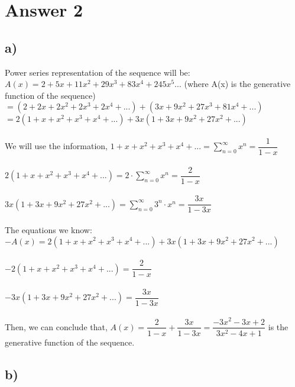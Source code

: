 \documentclass[12pt]{article}
\begin{document}
\section*{Answer 2}
\subsection*{a) }
Power series representation of the sequence will be:\\
$A(x) = 2 + 5x + 11x^2 + 29x^3 + 83x^4 + 245x^5 ...$ (where A(x) is the generative function of the sequence)\\
$= (2 + 2x + 2x^2 + 2x^3 +2x^4 + ...) + (3x + 9x^2 + 27x^3 + 81x^4 + ...)$\\
$= 2(1 + x + x^2 + x^3 + x^4 + ...) + 3x(1 + 3x + 9x^2 + 27x^2 + ...)$\\
\\
We will use the information, $1 + x + x^2 + x^3 + x^4 + ... = \sum^{\infty}_{n=0} x^n = \dfrac{1}{1-x}$\\
\\
$2(1 + x + x^2 + x^3 + x^4 + ...) = 2 \cdot \sum^{\infty}_{n=0} x^n = \dfrac{2}{1-x}$\\
\\
$3x(1 + 3x + 9x^2 + 27x^2 + ...) = \sum^{\infty}_{n=0} 3^n \cdot x^n = \dfrac{3x}{1-3x}$\\
\\
The equations we know:\\
$-$$A(x) = 2(1 + x + x^2 + x^3 + x^4 + ...) + 3x(1 + 3x + 9x^2 + 27x^2 + ...)$\\
\\
$-$$2(1 + x + x^2 + x^3 + x^4 + ...) = \dfrac{2}{1-x}$\\
\\
$-$$3x(1 + 3x + 9x^2 + 27x^2 + ...) = \dfrac{3x}{1-3x}$\\
\\
Then, we can conclude that, $A(x) = \dfrac{2}{1-x} + \dfrac{3x}{1-3x} = \dfrac{-3x^2 - 3x + 2}{3x^2 - 4x + 1}$ is the generative function of the sequence.\\


\subsection*{b) }
\end{document}
